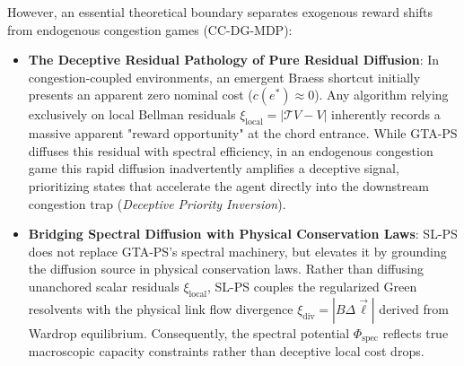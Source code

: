 \documentclass[11pt,a4paper]{article}
\begin{document}
However, an essential theoretical boundary separates exogenous reward shifts from endogenous congestion games (CC-DG-MDP):
\begin{itemize}
    \item \textbf{The Deceptive Residual Pathology of Pure Residual Diffusion}: In congestion-coupled environments, an emergent Braess shortcut initially presents an apparent zero nominal cost ($c(e^*) \approx 0$). Any algorithm relying exclusively on local Bellman residuals $\xi_{\text{local}} = |\mathcal{T}V - V|$ inherently records a massive apparent "reward opportunity" at the chord entrance. While GTA-PS diffuses this residual with spectral efficiency, in an endogenous congestion game this rapid diffusion inadvertently amplifies a deceptive signal, prioritizing states that accelerate the agent directly into the downstream congestion trap (\textit{Deceptive Priority Inversion}).
    \item \textbf{Bridging Spectral Diffusion with Physical Conservation Laws}: SL-PS does not replace GTA-PS's spectral machinery, but elevates it by grounding the diffusion source in physical conservation laws. Rather than diffusing unanchored scalar residuals $\xi_{\text{local}}$, SL-PS couples the regularized Green resolvents with the physical link flow divergence $\xi_{\text{div}} = |B \Delta \vec{\ell}|$ derived from Wardrop equilibrium. Consequently, the spectral potential $\Phi_{\text{spec}}$ reflects true macroscopic capacity constraints rather than deceptive local cost drops.
\end{itemize}
\end{document}
